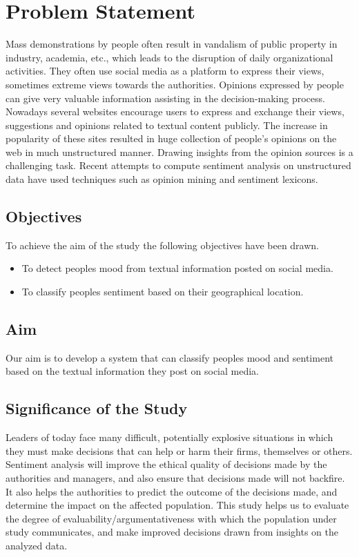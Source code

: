 

\chapter{Problem Statement}
Mass demonstrations by people often result in vandalism of public property in industry, academia, etc., which leads to the disruption of daily organizational activities. They often use social media as a platform to express their views, sometimes extreme views towards the authorities. Opinions expressed by people can give very valuable information assisting in the decision-making process. Nowadays several websites encourage users to express and exchange their views, suggestions and opinions related to textual content publicly. The increase in popularity of these sites resulted in huge collection of people's opinions on the web in much unstructured manner. Drawing insights from the opinion sources is a challenging task. Recent attempts to compute sentiment analysis on unstructured data have used techniques such as opinion mining and sentiment lexicons.


\section{Objectives}
To achieve the aim of the study the following objectives have been drawn. 
\begin{itemize}
\item To detect people\textquotesingle s mood from textual information posted on social media.
\item To classify people\textquotesingle s sentiment based on their geographical location.
\end{itemize}

\section{Aim}

Our aim is to develop a system that can classify people\textquotesingle s mood and sentiment based on the textual information they post on social media.



\section{Significance of the Study}
Leaders of today face many difficult, potentially explosive situations in which they must make decisions that can help or harm their firms, themselves or others. Sentiment analysis will improve the ethical quality of decisions made by the authorities and managers, and also ensure that decisions made will not backfire. It also helps the authorities to predict the outcome of the decisions made, and determine the impact on the affected population. This study helps us to evaluate the degree of evaluability/argumentativeness with which the population under study communicates, and make improved decisions drawn from insights on the analyzed data.



